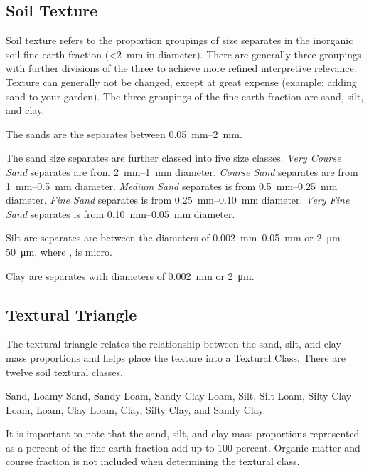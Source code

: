 \documentclass[a5paper]{report}
\begin{document}
\subsection{Soil Texture}
    
Soil texture refers to the proportion groupings of size separates in the inorganic soil fine earth fraction (\textless \qty[mode = text]{2}{\milli\metre} in diameter). There are generally three groupings with further divisions of the three to achieve more refined interpretive relevance. Texture can generally not be changed, except at great expense (example: adding sand to your garden). The three groupings of the fine earth fraction are sand, silt, and clay.
    
The sands are the separates between \qtyrange{0.05}{2}{\milli\metre}.

The sand size separates are further classed into five size classes. \emph{Very Course Sand} separates are from \qtyrange{2}{1}{\milli\metre} diameter. \emph{Course Sand} separates are from \qtyrange{1}{0.5}{\milli\metre} diameter. \emph{Medium Sand} separates is from \qtyrange{0.5}{0.25}{\milli\metre} diameter. \emph{Fine Sand} separates is from \qtyrange{0.25}{0.10}{\milli\metre} diameter. \emph{Very Fine Sand} separates is from \qtyrange{0.10}{0.05}{\milli\metre} diameter.
    
Silt are separates are between the diameters of \qtyrange{0.002}{0.05}{\milli\metre} or \qtyrange{2}{50}{\micro\metre}, where \unit{\micro}, is micro.

Clay are separates with diameters of \qty[mode = text]{0.002}{\milli\metre} or \qty[mode = text]{2}{\micro\metre}.

\subsection{Textural Triangle}
    
The textural triangle relates the relationship between the sand, silt, and clay mass proportions and helps place the texture into a Textural Class. There are twelve soil textural classes.
    
Sand, Loamy Sand, Sandy Loam, Sandy Clay Loam, Silt, Silt Loam, Silty Clay Loam, Loam, Clay Loam, Clay, Silty Clay, and Sandy Clay.
    
It is important to note that the sand, silt, and clay mass proportions represented as a percent of the fine earth fraction add up to 100 percent. Organic matter and course fraction is not included when determining the textural class.
    
\end{document}
